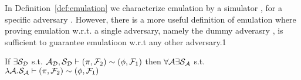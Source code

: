 In Definition~\ref{def:emulation} we characterize emulation by a simulator \Simulator, for a specific adversary \Adversary.
However, there is a more useful definition of emulation where proving emulation w.r.t. a single adversary, namely the dummy adverasry \DummyAdv, is sufficient to guarantee emulatioon w.r.t any other adversary.1

\begin{theorem}\label{thm:dummy}
If $\exists \mathcal{S}_{\mathcal{D}}$ s.t. $ \mathcal{A}_\mathcal{D}, \mathcal{S}_{\mathcal{D}} \vdash (\pi, \mathcal{F}_2) \sim (\phi, \mathcal{F}_1)$ then $\forall \mathcal{A} \exists \mathcal{S}_\mathcal{A}$ s.t. $\lambda \mathcal{A} . \mathcal{S}_\mathcal{A}\vdash  (\pi, \mathcal{F}_2) \sim (\phi, \mathcal{F}_1)$ 



\end{theorem}

